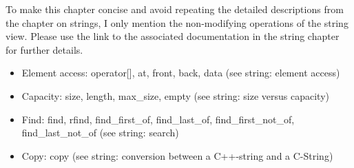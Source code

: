To make this chapter concise and avoid repeating the detailed descriptions from the chapter on strings, I only mention the non-modifying operations of the string view. Please use the link to the associated documentation in the string chapter for further details.

\begin{itemize}
\item 
Element access: operator[], at, front, back, data (see string: element access)

\item
Capacity: size, length, max\_size, empty (see string: size versus capacity)

\item
Find: find, rfind, find\_first\_of, find\_last\_of, find\_first\_not\_of, find\_last\_not\_of (see
string: search)

\item
Copy: copy (see string: conversion between a C++-string and a C-String)
\end{itemize}
















